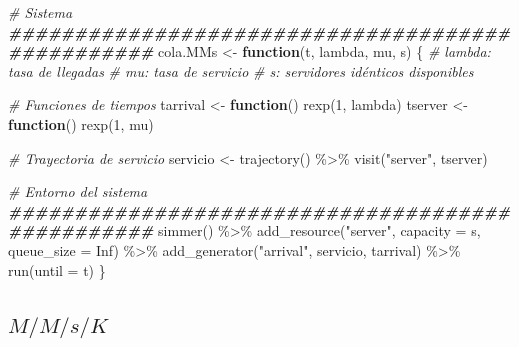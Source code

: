 \documentclass[
]{book}
\newenvironment{Shaded}{\begin{snugshade}}{\end{snugshade}}
\newcommand{\AttributeTok}[1]{\textcolor[rgb]{0.77,0.63,0.00}{#1}}
\newcommand{\CommentTok}[1]{\textcolor[rgb]{0.56,0.35,0.01}{\textit{#1}}}
\newcommand{\ConstantTok}[1]{\textcolor[rgb]{0.00,0.00,0.00}{#1}}
\newcommand{\ControlFlowTok}[1]{\textcolor[rgb]{0.13,0.29,0.53}{\textbf{#1}}}
\newcommand{\DecValTok}[1]{\textcolor[rgb]{0.00,0.00,0.81}{#1}}
\newcommand{\DocumentationTok}[1]{\textcolor[rgb]{0.56,0.35,0.01}{\textbf{\textit{#1}}}}
\newcommand{\FunctionTok}[1]{\textcolor[rgb]{0.00,0.00,0.00}{#1}}
\newcommand{\NormalTok}[1]{#1}
\newcommand{\OtherTok}[1]{\textcolor[rgb]{0.56,0.35,0.01}{#1}}
\newcommand{\SpecialCharTok}[1]{\textcolor[rgb]{0.00,0.00,0.00}{#1}}
\newcommand{\StringTok}[1]{\textcolor[rgb]{0.31,0.60,0.02}{#1}}
\theoremstyle{definition}
\theoremstyle{definition}
\theoremstyle{definition}
\theoremstyle{definition}
\theoremstyle{remark}
\begin{document}
\begin{Shaded}
\begin{Highlighting}[]
\CommentTok{\# Sistema}
\DocumentationTok{\#\#\#\#\#\#\#\#\#\#\#\#\#\#\#\#\#\#\#\#\#\#\#\#\#\#\#\#\#\#\#\#\#\#\#\#\#\#\#\#\#\#\#\#\#\#\#\#\#}
\NormalTok{cola.MMs }\OtherTok{\textless{}{-}} \ControlFlowTok{function}\NormalTok{(t, lambda, mu, s)}
\NormalTok{\{}
  \CommentTok{\# lambda: tasa de llegadas}
  \CommentTok{\# mu: tasa de servicio}
  \CommentTok{\# s: servidores idénticos disponibles}

  \CommentTok{\# Funciones de tiempos}
\NormalTok{  tarrival }\OtherTok{\textless{}{-}} \ControlFlowTok{function}\NormalTok{() }\FunctionTok{rexp}\NormalTok{(}\DecValTok{1}\NormalTok{, lambda)}
\NormalTok{  tserver }\OtherTok{\textless{}{-}} \ControlFlowTok{function}\NormalTok{() }\FunctionTok{rexp}\NormalTok{(}\DecValTok{1}\NormalTok{, mu)}
  
  \CommentTok{\# Trayectoria de servicio}
\NormalTok{  servicio }\OtherTok{\textless{}{-}} \FunctionTok{trajectory}\NormalTok{() }\SpecialCharTok{\%\textgreater{}\%}
    \FunctionTok{visit}\NormalTok{(}\StringTok{"server"}\NormalTok{, tserver)               }

  \CommentTok{\# Entorno del sistema }
  \DocumentationTok{\#\#\#\#\#\#\#\#\#\#\#\#\#\#\#\#\#\#\#\#\#\#\#\#\#\#\#\#\#\#\#\#\#\#\#\#\#\#\#\#\#\#\#\#\#\#\#\#\#}
  \FunctionTok{simmer}\NormalTok{() }\SpecialCharTok{\%\textgreater{}\%}
    \FunctionTok{add\_resource}\NormalTok{(}\StringTok{"server"}\NormalTok{, }\AttributeTok{capacity =}\NormalTok{ s, }\AttributeTok{queue\_size =} \ConstantTok{Inf}\NormalTok{) }\SpecialCharTok{\%\textgreater{}\%}           
    \FunctionTok{add\_generator}\NormalTok{(}\StringTok{"arrival"}\NormalTok{, servicio, tarrival) }\SpecialCharTok{\%\textgreater{}\%} 
    \FunctionTok{run}\NormalTok{(}\AttributeTok{until =}\NormalTok{ t)     }
\NormalTok{\}}
\end{Highlighting}
\end{Shaded}

\hypertarget{mmsk-1}{%
\subsection{\texorpdfstring{\(M/M/s/K\)}{M/M/s/K}}\label{mmsk-1}}
\end{document}
